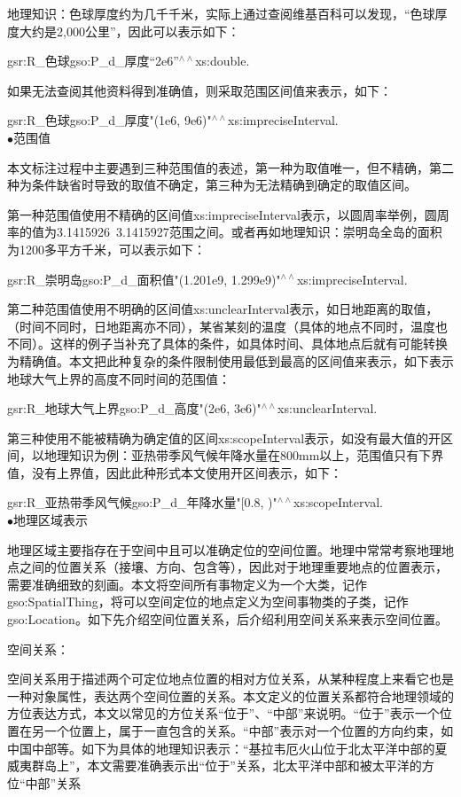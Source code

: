 地理知识：色球厚度约为几千千米，实际上通过查阅维基百科可以发现，“色球厚度大约是2,000公里”，因此可以表示如下：

gsr:R\_色球\quad gso:P\_d\_厚度\quad “2e6”$^{\land\land}$xs:double\quad .

如果无法查阅其他资料得到准确值，则采取范围区间值来表示，如下：

gsr:R\_色球\quad gso:P\_d\_厚度\quad "(1e6, 9e6)"$^{\land\land}$\quad xs:impreciseInterval\quad .
\\

$\bullet$范围值

本文标注过程中主要遇到三种范围值的表述，第一种为取值唯一，但不精确，第二种为条件缺省时导致的取值不确定，第三种为无法精确到确定的取值区间。

第一种范围值使用不精确的区间值xs:impreciseInterval表示，以圆周率举例，圆周率的值为3.1415926~3.1415927范围之间。或者再如地理知识：崇明岛全岛的面积为1200多平方千米，可以表示如下：

gsr:R\_崇明岛\quad gso:P\_d\_面积值\quad "(1.201e9, 1.299e9)"$^{\land\land}$xs:impreciseInterval\quad .

第二种范围值使用不明确的区间值xs:unclearInterval表示，如日地距离的取值，（时间不同时，日地距离亦不同），某省某刻的温度（具体的地点不同时，温度也不同）。这样的例子当补充了具体的条件，如具体时间、具体地点后就有可能转换为精确值。本文把此种复杂的条件限制使用最低到最高的区间值来表示，如下表示地球大气上界的高度不同时间的范围值：

gsr:R\_地球大气上界\quad gso:P\_d\_高度\quad "(2e6,  3e6)"$^{\land\land}$xs:unclearInterval\quad .

第三种使用不能被精确为确定值的区间xs:scopeInterval表示，如没有最大值的开区间，以地理知识为例：亚热带季风气候年降水量在800mm以上，范围值只有下界值，没有上界值，因此此种形式本文使用开区间表示，如下：


gsr:R\_亚热带季风气候\quad gso:P\_d\_年降水量\quad "[0.8, )"$^{\land\land}$xs:scopeInterval\quad .
\\

$\bullet$地理区域表示

地理区域主要指存在于空间中且可以准确定位的空间位置。地理中常常考察地理地点之间的位置关系（接壤、方向、包含等），因此对于地理重要地点的位置表示，需要准确细致的刻画。本文将空间所有事物定义为一个大类，记作gso:SpatialThing，将可以空间定位的地点定义为空间事物类的子类，记作gso:Location。如下先介绍空间位置关系，后介绍利用空间关系来表示空间位置。

空间关系：

空间关系用于描述两个可定位地点位置的相对方位关系，从某种程度上来看它也是一种对象属性，表达两个空间位置的关系。本文定义的位置关系都符合地理领域的方位表达方式，本文以常见的方位关系“位于”、“中部”来说明。“位于”表示一个位置在另一个位置上，属于一直包含的关系。“中部”表示对一个位置的方向约束，如中国中部等。如下为具体的地理知识表示：“基拉韦厄火山位于北太平洋中部的夏威夷群岛上”，本文需要准确表示出“位于”关系，北太平洋中部和被太平洋的方位“中部”关系

